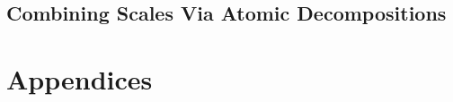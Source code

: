 \documentclass[12pt]{report}
\theoremstyle{plain}
\theoremstyle{remark}
\numberwithin{equation}{section}
\begin{document}
\chapter{Combining Scales Via Atomic Decompositions} \label{chap:spectralatomicdchapter}


\part{Appendices}
\renewcommand\chaptername{Appendix}


%

%

\singlespacing
\printbibliography
\end{document}
